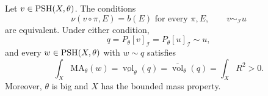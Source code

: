 \begin{proposition}\label{countable-divisorial:positive-mass}
Let $v\in\mathrm{PSH}(X,\theta)$. The conditions
\[
 \nu(v\circ\pi,E)=b(E)\text{ for every }\pi,E,
 \qquad v\sim_{\mathcal I}u
\]
are equivalent. Under either condition,
\[
 q=P_\theta[v]_{\mathcal I}=P_\theta[u]_{\mathcal I}\sim u,
\]
and every $w\in\mathrm{PSH}(X,\theta)$ with $w\sim q$ satisfies
\begin{equation}\label{eq:countable-divisorial-positive-mass}
 \int_X\mathrm{MA}_\theta(w)
 =\underline{\operatorname{vol}}_\theta(q)
 =\overline{\operatorname{vol}}_\theta(q)
 =\int_XR^2>0.
\end{equation}
Moreover, $\theta$ is big and $X$ has the bounded mass property.
\end{proposition}
